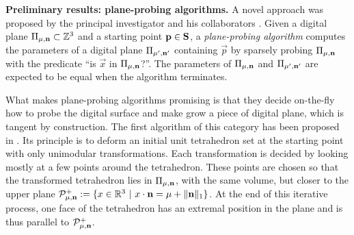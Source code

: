 \noindent\textbf{Preliminary results: plane-probing algorithms.}
A novel approach was proposed by the principal investigator and his collaborators
\cite{LPRTCS2016, LPRDGCI2016, LPRJMIV2017}. 
Given a digital plane $\Pi_{\mu,\mathbf{n}} \subset {\ensuremath\mathbb{Z}}^3$
and a starting point $\mathbf{p} \in \mathbf{S}$, 
a \emph{plane-probing algorithm} computes the parameters of a digital plane $\Pi_{\mu',\mathbf{n}'}$
containing $\vec{p}$ by sparsely probing $\Pi_{\mu,\mathbf{n}}$ with the predicate
``is $\vec{x}$ in $\Pi_{\mu,\mathbf{n}}$?''. The parameters of $\Pi_{\mu,\mathbf{n}}$
and $\Pi_{\mu',\mathbf{n}'}$ are expected to be equal when the algorithm terminates.

What makes plane-probing algorithms promising is that they decide on-the-fly how
to probe the digital surface and make grow a piece of digital plane, which is
tangent by construction. 
The first algorithm of this category has been proposed in \cite{LPRTCS2016}.
Its principle is to deform an initial unit tetrahedron set at the starting point
with only unimodular transformations. Each transformation is decided by looking
mostly at a few points around the tetrahedron. These points are chosen so that
the transformed tetrahedron lies in $\Pi_{\mu,\mathbf{n}}$, with the same volume,
but closer to the upper plane
$\mathcal{P}^{+}_{\mu,\mathbf{n}} := \{ x \in {\ensuremath\mathbb{R}}^3 \ | \ x \cdot \mathbf{n} = \mu + \|\mathbf{n}\|_1 \}$.
At the end of this iterative process, one face of the tetrahedron has an extremal
position in the plane and is thus parallel to $\mathcal{P}^{+}_{\mu,\mathbf{n}}$.

